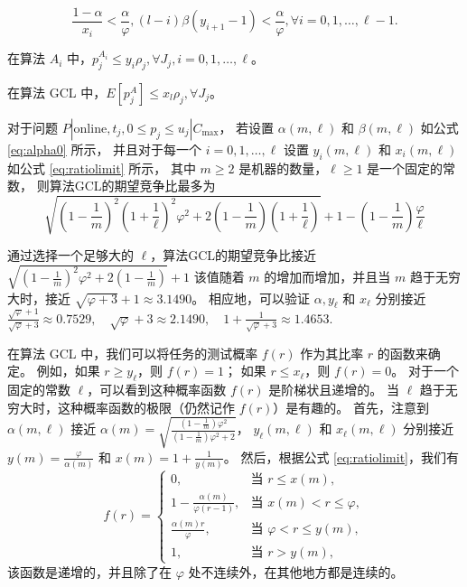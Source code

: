 \begin{lem}
\label{lem8}
\[
    \frac{1-\alpha}{x_i} < \frac{\alpha}{\varphi},
    (l-i)\beta(y_{i+1}-1) < \frac{\alpha}{\varphi},
    \forall i=0,1,\dots,\ell-1.
\]
\end{lem}

\begin{lem}
在算法 \( A_i \) 中，\( p_j^{A_i}\leq y_i\rho_j, \forall J_j, i=0,1,\dots,\ell \)。
\end{lem}

\begin{lem}
在算法 GCL 中，$E[p_j^A]\leq x_l\rho_j, \forall J_j$。
\end{lem}

\begin{thm}
    \label{thm:thm4}
    对于问题 \( P | \text{online}, t_j, 0 \leq p_j \leq u_j | C_{\max} \)，
    若设置 \( \alpha(m, \ell) \) 和 \( \beta(m, \ell) \) 如公式 \ref{eq:alpha0} 所示，
    并且对于每一个 \( i = 0, 1, \ldots, \ell \) 
    设置 \( y_i(m, \ell) \) 和 \( x_i(m, \ell) \) 如公式 \ref{eq:ratiolimit} 所示，
    其中 \( m \geq 2 \) 是机器的数量，\( \ell \geq 1 \) 是一个固定的常数，
    则算法GCL的期望竞争比最多为
    \[
        \sqrt{(1 - \frac{1}{m})^2 (1 + \frac{1}{\ell})^2 \varphi^2 + 2(1 - \frac{1}{m})(1 + \frac{1}{\ell})} + 1 - (1 - \frac{1}{m}) \frac{\varphi}{\ell}
    \]
\end{thm}

通过选择一个足够大的 \( \ell \)，算法GCL的期望竞争比接近
\( \sqrt{(1 - \frac{1}{m})^2 \varphi^2 + 2(1 - \frac{1}{m})} + 1 \)
该值随着 \( m \) 的增加而增加，并且当 \( m \) 趋于无穷大时，接近 \( \sqrt{\varphi + 3} + 1 \approx 3.1490 \)。
相应地，可以验证 \( \alpha, y_\ell \) 和 \( x_\ell \) 分别接近
\( \frac{\sqrt{\varphi} + 1}{\sqrt{\varphi} + 3} \approx 0.7529, \quad \sqrt{\varphi} + 3 \approx 2.1490, \quad 1 + \frac{1}{\sqrt{\varphi} + 3} \approx 1.4653. \)

在算法 GCL 中，我们可以将任务的测试概率 \( f(r) \) 作为其比率 \( r \) 的函数来确定。
例如，如果 \( r \geq y_\ell \)，则 \( f(r) = 1 \)；
如果 \( r \leq x_\ell \)，则 \( f(r) = 0 \)。
对于一个固定的常数 \( \ell \)，可以看到这种概率函数 \( f(r) \) 是阶梯状且递增的。
当 \( \ell \) 趋于无穷大时，这种概率函数的极限（仍然记作 \( f(r) \)）是有趣的。
首先，注意到 \( \alpha(m, \ell) \) 接近 \( \alpha(m) = \sqrt{\frac{(1 - \frac{1}{m}) \varphi^2}{(1 - \frac{1}{m}) \varphi^2 + 2}} \)，
\( y_\ell(m, \ell) \) 和 \( x_\ell(m, \ell) \) 分别接近 \( y(m) = \frac{\varphi}{\alpha(m)} \) 和 \( x(m) = 1 + \frac{1}{y(m)} \)。
然后，根据公式 \ref{eq:ratiolimit}，我们有
\[
f(r) =
\begin{cases}
0, & \text{当 } r \leq x(m), \\
1 - \frac{\alpha(m)}{\varphi (r-1)}, & \text{当 } x(m) < r \leq \varphi, \\
\frac{\alpha(m) r}{\varphi}, & \text{当 } \varphi < r \leq y(m), \\
1, & \text{当 } r > y(m),
\end{cases}
\]
该函数是递增的，并且除了在 \( \varphi \) 处不连续外，在其他地方都是连续的。

